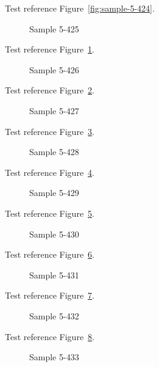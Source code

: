 Test reference Figure~\ref{fig:sample-5-424}.

\begin{figure}[tbhp]
\caption{Sample 5-425}
\label{fig:sample-5-425}
\end{figure}

Test reference Figure~\ref{fig:sample-5-425}.

\begin{figure}[tbhp]
\caption{Sample 5-426}
\label{fig:sample-5-426}
\end{figure}

Test reference Figure~\ref{fig:sample-5-426}.

\begin{figure}[tbhp]
\caption{Sample 5-427}
\label{fig:sample-5-427}
\end{figure}

Test reference Figure~\ref{fig:sample-5-427}.

\begin{figure}[tbhp]
\caption{Sample 5-428}
\label{fig:sample-5-428}
\end{figure}

Test reference Figure~\ref{fig:sample-5-428}.

\begin{figure}[tbhp]
\caption{Sample 5-429}
\label{fig:sample-5-429}
\end{figure}

Test reference Figure~\ref{fig:sample-5-429}.

\begin{figure}[tbhp]
\caption{Sample 5-430}
\label{fig:sample-5-430}
\end{figure}

Test reference Figure~\ref{fig:sample-5-430}.

\begin{figure}[tbhp]
\caption{Sample 5-431}
\label{fig:sample-5-431}
\end{figure}

Test reference Figure~\ref{fig:sample-5-431}.

\begin{figure}[tbhp]
\caption{Sample 5-432}
\label{fig:sample-5-432}
\end{figure}

Test reference Figure~\ref{fig:sample-5-432}.

\begin{figure}[tbhp]
\caption{Sample 5-433}
\label{fig:sample-5-433}
\end{figure}

